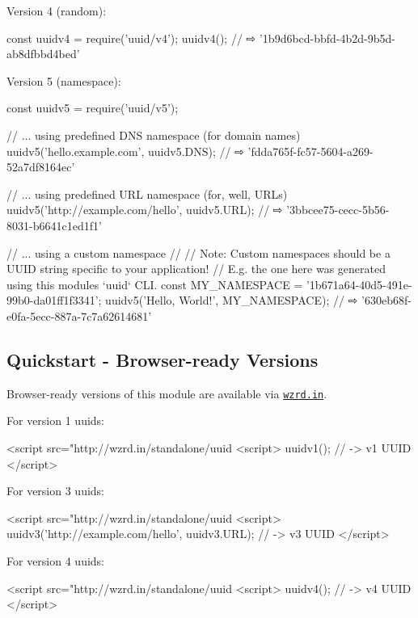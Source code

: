 Version 4 (random)\+:


\begin{DoxyCode}
const uuidv4 = require('uuid/v4');
uuidv4(); // ⇨ '1b9d6bcd-bbfd-4b2d-9b5d-ab8dfbbd4bed'
\end{DoxyCode}


Version 5 (namespace)\+:


\begin{DoxyCode}
const uuidv5 = require('uuid/v5');

// ... using predefined DNS namespace (for domain names)
uuidv5('hello.example.com', uuidv5.DNS); // ⇨ 'fdda765f-fc57-5604-a269-52a7df8164ec'

// ... using predefined URL namespace (for, well, URLs)
uuidv5('http://example.com/hello', uuidv5.URL); // ⇨ '3bbcee75-cecc-5b56-8031-b6641c1ed1f1'

// ... using a custom namespace
//
// Note: Custom namespaces should be a UUID string specific to your application!
// E.g. the one here was generated using this modules `uuid` CLI.
const MY\_NAMESPACE = '1b671a64-40d5-491e-99b0-da01ff1f3341';
uuidv5('Hello, World!', MY\_NAMESPACE); // ⇨ '630eb68f-e0fa-5ecc-887a-7c7a62614681'
\end{DoxyCode}


\subsection*{Quickstart -\/ Browser-\/ready Versions}

Browser-\/ready versions of this module are available via \href{https://github.com/jfhbrook/wzrd.in}{\tt wzrd.\+in}.

For version 1 uuids\+:


\begin{DoxyCode}
<script src="http://wzrd.in/standalone/uuid%
<script>
uuidv1(); // -> v1 UUID
</script>
\end{DoxyCode}


For version 3 uuids\+:


\begin{DoxyCode}
<script src="http://wzrd.in/standalone/uuid%
<script>
uuidv3('http://example.com/hello', uuidv3.URL); // -> v3 UUID
</script>
\end{DoxyCode}


For version 4 uuids\+:


\begin{DoxyCode}
<script src="http://wzrd.in/standalone/uuid%
<script>
uuidv4(); // -> v4 UUID
</script>
\end{DoxyCode}


